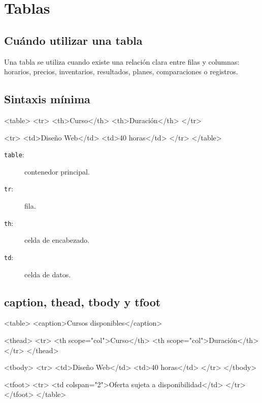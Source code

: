 \documentclass[11pt]{article}
\begin{document}
\tableofcontents
\newpage
\section{Tablas}

\subsection{Cuándo utilizar una tabla}

Una tabla se utiliza cuando existe una relación clara entre filas y columnas: horarios, precios, inventarios,
resultados, planes, comparaciones o registros.


\subsection{Sintaxis mínima}

\begin{htmlcodedark}
    <table>
    <tr>
    <th>Curso</th>
    <th>Duración</th>
    </tr>

    <tr>
    <td>Diseño Web</td>
    <td>40 horas</td>
    </tr>
    </table>
\end{htmlcodedark}

\begin{description}
    \item[\texttt{table}:] contenedor principal.
    \item[\texttt{tr}:] fila.
    \item[\texttt{th}:] celda de encabezado.
    \item[\texttt{td}:] celda de datos.
\end{description}

\subsection{caption, thead, tbody y tfoot}

\begin{htmlcodedark}
    <table>
    <caption>Cursos disponibles</caption>

    <thead>
    <tr>
    <th scope="col">Curso</th>
    <th scope="col">Duración</th>
    </tr>
    </thead>

    <tbody>
    <tr>
    <td>Diseño Web</td>
    <td>40 horas</td>
    </tr>
    </tbody>

    <tfoot>
    <tr>
    <td colspan="2">Oferta sujeta a disponibilidad</td>
    </tr>
    </tfoot>
    </table>
\end{htmlcodedark}
\end{document}
